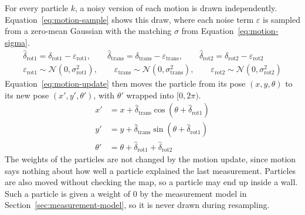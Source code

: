 For every particle $k$, a noisy version of each motion is drawn independently.
Equation~\ref{eq:motion-sample} shows this draw, where each noise term $\varepsilon$ is
sampled from a zero-mean Gaussian with the matching $\sigma$ from
Equation~\ref{eq:motion-sigma}.
\begin{equation}
  \label{eq:motion-sample}
  \begin{gathered}
    \hat{\delta}_{\mathrm{rot1}} = \delta_{\mathrm{rot1}} - \varepsilon_{\mathrm{rot1}}, \qquad
    \hat{\delta}_{\mathrm{trans}} = \delta_{\mathrm{trans}} - \varepsilon_{\mathrm{trans}}, \qquad
    \hat{\delta}_{\mathrm{rot2}} = \delta_{\mathrm{rot2}} - \varepsilon_{\mathrm{rot2}} \\[4pt]
    \varepsilon_{\mathrm{rot1}} \sim \mathcal{N}\!\left(0, \sigma_{\mathrm{rot1}}^2\right), \qquad
    \varepsilon_{\mathrm{trans}} \sim \mathcal{N}\!\left(0, \sigma_{\mathrm{trans}}^2\right), \qquad
    \varepsilon_{\mathrm{rot2}} \sim \mathcal{N}\!\left(0, \sigma_{\mathrm{rot2}}^2\right)
  \end{gathered}
\end{equation}
Equation~\ref{eq:motion-update} then moves the particle from its pose
$(x, y, \theta)$ to its new pose $(x', y', \theta')$, with $\theta'$ wrapped into
$[0, 2\pi)$.
\begin{equation}
  \label{eq:motion-update}
  \begin{aligned}
    x'      &= x + \hat{\delta}_{\mathrm{trans}} \cos(\theta + \hat{\delta}_{\mathrm{rot1}}) \\
    y'      &= y + \hat{\delta}_{\mathrm{trans}} \sin(\theta + \hat{\delta}_{\mathrm{rot1}}) \\
    \theta' &= \theta + \hat{\delta}_{\mathrm{rot1}} + \hat{\delta}_{\mathrm{rot2}}
  \end{aligned}
\end{equation}
The weights of the particles are not changed by the motion update, since motion says nothing
about how well a particle explained the last measurement. Particles are also moved without
checking the map, so a particle may end up inside a wall. Such a particle is given a weight of
0 by the measurement model in Section~\ref{sec:measurement-model}, so it is never drawn
during resampling.

